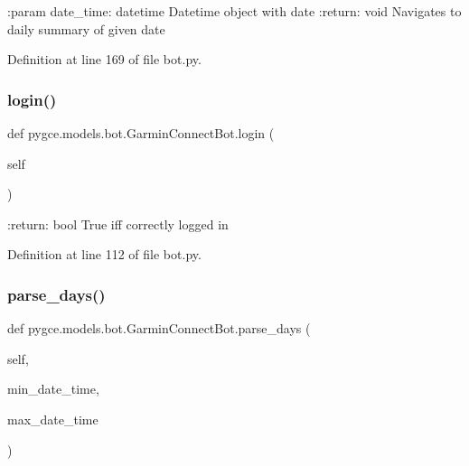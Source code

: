 \begin{DoxyVerb}:param date_time: datetime
    Datetime object with date
:return: void
    Navigates to daily summary of given date
\end{DoxyVerb}
 

Definition at line 169 of file bot.\+py.

\mbox{\label{classpygce_1_1models_1_1bot_1_1_garmin_connect_bot_a31c8153cff1e4c2ce2a66d3b3aada3f1}} 
\subsubsection{\texorpdfstring{login()}{login()}}
{\footnotesize\ttfamily def pygce.\+models.\+bot.\+Garmin\+Connect\+Bot.\+login (\begin{DoxyParamCaption}\item[{}]{self }\end{DoxyParamCaption})}

\begin{DoxyVerb}:return: bool
    True iff correctly logged in
\end{DoxyVerb}
 

Definition at line 112 of file bot.\+py.

\mbox{\label{classpygce_1_1models_1_1bot_1_1_garmin_connect_bot_a17c3b23e3a712395581e88294308b822}} 
\subsubsection{\texorpdfstring{parse\+\_\+days()}{parse\_days()}}
{\footnotesize\ttfamily def pygce.\+models.\+bot.\+Garmin\+Connect\+Bot.\+parse\+\_\+days (\begin{DoxyParamCaption}\item[{}]{self,  }\item[{}]{min\+\_\+date\+\_\+time,  }\item[{}]{max\+\_\+date\+\_\+time }\end{DoxyParamCaption})}

